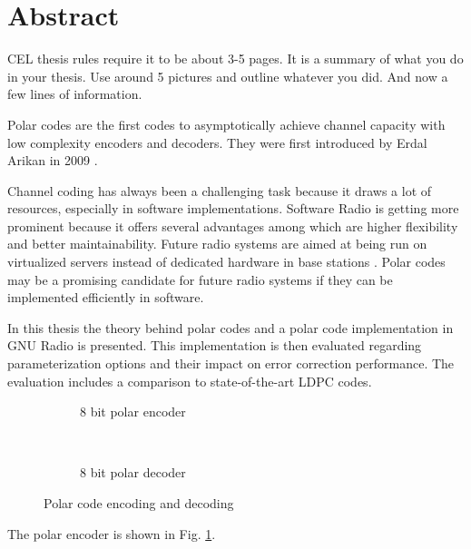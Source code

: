 \chapter*{Abstract}

CEL thesis rules require it to be about 3-5 pages. 
It is a summary of what you do in your thesis.
Use around 5 pictures and outline whatever you did.
And now a few lines of information.


Polar codes are the first codes to asymptotically achieve channel capacity with low complexity encoders and decoders.
They were first introduced by Erdal Arikan in 2009 \cite{polar:arikan09}.

Channel coding has always been a challenging task because it draws a lot of resources, especially in software implementations.
Software Radio is getting more prominent because it offers several advantages among which are higher flexibility and better maintainability.
Future radio systems are aimed at being run on virtualized servers instead of dedicated hardware in base stations \cite{cloudran:2015}.
Polar codes may be a promising candidate for future radio systems if they can be implemented efficiently in software.

In this thesis the theory behind polar codes and a polar code implementation in GNU Radio is presented.
This implementation is then evaluated regarding parameterization options and their impact on error correction performance.
The evaluation includes a comparison to state-of-the-art \ac{LDPC} codes.


\begin{figure}[!htb]
  \begin{subfigure}[t]{.49\textwidth}
    \begin{center}
      \def\dist{1.5}
      \def\power{3}
      
      \caption{8 bit polar encoder}
      \label{abs:polar_8bit_encoder_natural}
    \end{center}
  \end{subfigure}\,%
  \begin{subfigure}[t]{.49\textwidth}
    \begin{center}
      \def\dist{1.5}
      \def\power{3}
      
      \caption{8 bit polar decoder}
      \label{abs:polar_8bit_decoder}
    \end{center}
  \end{subfigure}%
  \caption{Polar code encoding and decoding}
  \label{abs:encoder-decoder}
\end{figure}

The polar encoder is shown in Fig. \ref{abs:polar_8bit_encoder_natural}.

